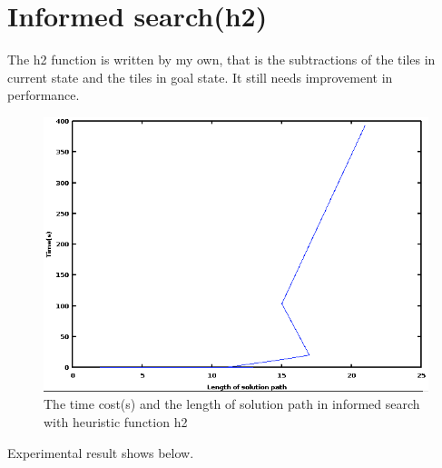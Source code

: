\documentclass{article}
\begin{document}
\section{Informed search(h2)}
The h2 function is written by my own, that is the subtractions of the tiles in current state and the tiles in goal state. It still needs improvement in performance. 
\begin{figure}[H]
\includegraphics[width=1.0\textwidth]{h2.png}
\caption{The time cost(s) and the length of solution path in informed search with heuristic function h2}
\end{figure}
Experimental result shows below. 
\end{document}
